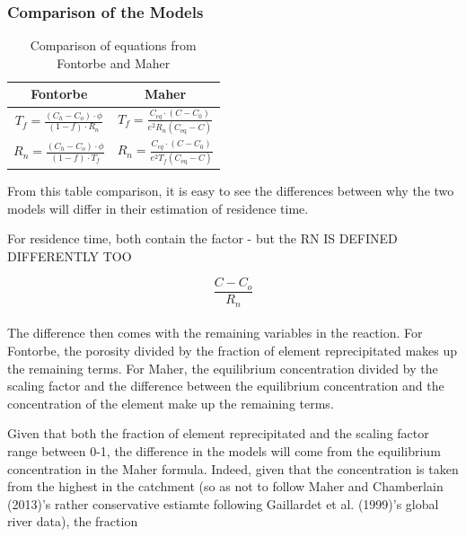 \newpage

\subsubsection{Comparison of the Models}

\begin{table}[h]
    \centering
    \renewcommand{\arraystretch}{2.2} %
    \begin{tabular}{cc}
        \toprule
        \textbf{Fontorbe} & \textbf{Maher} \\
        \midrule
        $\displaystyle T_f  = \frac{\left(C_h - C_o\right)\cdot\phi}{\left(1-f\right)\cdot R_n}$ & 
        $\displaystyle T_f = \frac{C_{eq} \cdot \left(C - C_0\right)}{e^2 R_n \left( C_{\text{eq}} - C \right)}$ \\ [10pt]
        $\displaystyle R_n  = \frac{\left(C_h - C_o\right)\cdot\phi}{\left(1-f\right)\cdot T_f}$ & 
        $\displaystyle R_n = \frac{C_{eq} \cdot \left(C - C_0\right)}{e^2 T_f \left( C_{\text{eq}} - C \right)}$ \\
        \bottomrule
    \end{tabular}
    \caption{Comparison of equations from Fontorbe and Maher}
    \label{tab:equations}
\end{table}


From this table comparison, it is easy to see the differences between why the two models will differ in their estimation of residence time.

\bsk

For residence time, both contain the factor - but the RN IS DEFINED DIFFERENTLY TOO \bsk

\[
\frac{C - C_o}{R_n}
\]\\

The difference then comes with the remaining variables in the reaction. For Fontorbe, the porosity divided by the fraction of element reprecipitated makes up the remaining terms. For Maher, the equilibrium concentration divided by the scaling factor and the difference between the equilibrium concentration and the concentration of the element make up the remaining terms.\\

\bsk

Given that both the fraction of element reprecipitated and the scaling factor range between 0-1, the difference in the models will come from the equilibrium concentration in the Maher formula. Indeed, given that the concentration is taken from the highest in the catchment (so as not to follow Maher and Chamberlain (2013)'s rather conservative estiamte following Gaillardet et al. (1999)'s global river data), the fraction \\

